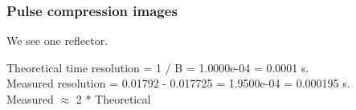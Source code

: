 \documentclass{beamer}
\begin{document}
\begin{frame}
	\frametitle{Pulse compression images}
	We see one reflector.
	\begin{figure}
	\end{figure}
    Theoretical time resolution = 1 / B = 1.0000e-04 = 0.0001 s.\\
    Measured resolution = 0.01792 - 0.017725 = 1.9500e-04 = 0.000195 s.\\
	Measured $\approx$ 2 * Theoretical\\
\end{frame}
\end{document}
